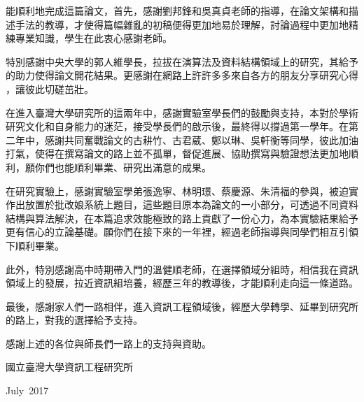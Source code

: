 \begin{acknowledgementsCH}

\setlength{\baselineskip}{1.5em}

能順利地完成這篇論文，首先，感謝劉邦鋒和吳真貞老師的指導，在論文架構和描
述手法的教導，才使得篇幅雜亂的初稿便得更加地易於理解，討論過程中更加地精
練專業知識，學生在此衷心感謝老師。

\vspace{0.5em}

特別感謝中央大學的郭人維學長，拉拔在演算法及資料結構領域上的研究，其給予
的助力使得論文開花結果。更感謝在網路上許許多多來自各方的朋友分享研究心得
，讓彼此切磋茁壯。

\vspace{0.5em}

在進入臺灣大學研究所的這兩年中，感謝實驗室學長們的鼓勵與支持，本對於學術
研究文化和自身能力的迷茫，接受學長們的啟示後，最終得以撐過第一學年。在第
二年中，感謝共同奮戰論文的古耕竹、古君葳、鄭以琳、吳軒衡等同學，彼此加油
打氣，使得在撰寫論文的路上並不孤單，督促進展、協助撰寫與驗證想法更加地順
利，願你們也能順利畢業、研究出滿意的成果。

\vspace{0.5em}

在研究實驗上，感謝實驗室學弟張逸寧、林明璟、蔡慶源、朱清福的參與，被迫實
作出放置於批改娘系統上題目，這些題目原本為論文的一小部分，可透過不同資料
結構與算法解決，在本篇追求效能極致的路上貢獻了一份心力，為本實驗結果給予
更有信心的立論基礎。願你們在接下來的一年裡，經過老師指導與同學們相互引領
下順利畢業。

\vspace{0.5em}

此外，特別感謝高中時期帶入門的溫健順老師，在選擇領域分組時，相信我在資訊
領域上的發展，拉近資訊組培養，經歷三年的教導後，才能順利走向這一條道路。

\vspace{0.5em}

最後，感謝家人們一路相伴，進入資訊工程領域後，經歷大學轉學、延畢到研究所
的路上，對我的選擇給予支持。

\vspace{0.5em}

感謝上述的各位與師長們一路上的支持與資助。

\vspace{2em}


\raggedright{國立臺灣大學資訊工程研究所}

\raggedright{July\ 2017}

\end{acknowledgementsCH}

